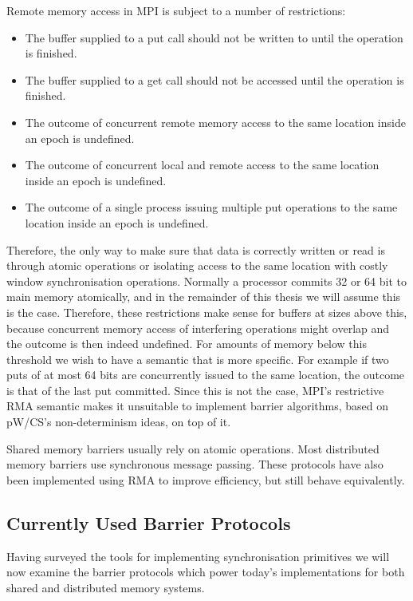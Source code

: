 \documentclass[a4paper, 10pt]{article}
\begin{document}
Remote memory access in MPI is subject to a number of restrictions:
\begin{itemize}
	\item The buffer supplied to a put call should not be written to until the operation is finished.
	\item The buffer supplied to a get call should not be accessed until the operation is finished.
	\item The outcome of concurrent remote memory access to the same location inside an epoch is undefined.
	\item The outcome of concurrent local and remote access to the same location inside an epoch is undefined.
	\item The outcome of a single process issuing multiple put operations to the same location inside an epoch is undefined.
\end{itemize}
Therefore, the only way to make sure that data is correctly written or read is through atomic operations or isolating access to the same location with costly window synchronisation operations.
Normally a processor commits 32 or 64 bit to main memory atomically, and in the remainder of this thesis we will assume this is the case.
Therefore, these restrictions make sense for buffers at sizes above this, because concurrent memory access of interfering operations might overlap and the outcome is then indeed undefined.
For amounts of memory below this threshold we wish to have a semantic that is more specific. For example if two puts of at most 64 bits are concurrently issued to the same location, the outcome is that of the last put committed. Since this is not the case, MPI's restrictive RMA semantic makes it unsuitable to implement barrier algorithms, based on pW/CS's non-determinism ideas, on top of it.

Shared memory barriers usually rely on atomic operations. Most distributed memory barriers use synchronous message passing. These protocols have also been implemented using RMA to improve efficiency, but still behave equivalently.

\subsection{Currently Used Barrier Protocols}
\label{ssec:background-currently-used}
Having surveyed the tools for implementing synchronisation primitives we will now examine the barrier protocols which power today's implementations for both shared and distributed memory systems.
\end{document}
